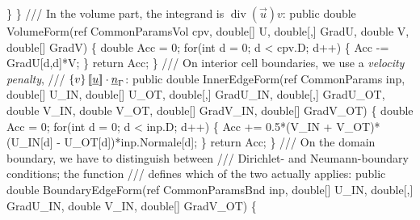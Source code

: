 {\btab \btab \}\newline 
\btab \}\newline 
 \newline 
    /// In the volume part, the integrand is $\operatorname{div}(\vec{u}) v$:
\btab public double VolumeForm(ref CommonParamsVol cpv, \newline 
\btab \btab double[] U, double[,] GradU, \newline 
\btab \btab double V, double[] GradV) \{\newline 
\btab \btab double Acc = 0;\newline 
\btab \btab for(int d = 0; d < cpv.D; d++) \{\newline 
\btab \btab \btab Acc -= GradU[d,d]*V;\newline 
\btab \btab \}\newline 
\btab \btab return Acc;\newline 
\btab \}\newline 
 \newline 
    /// On interior cell boundaries, we use a \emph{velocity penalty},
    /// $\left\{{v}\right\} \left[\!\left[{\underline{u}}\right]\!\right] \cdot \underline{n}_\Gamma$:
\btab public double InnerEdgeForm(ref CommonParams inp, \newline 
\btab \btab double[] U\_IN, double[] U\_OT, double[,] GradU\_IN, double[,] GradU\_OT, \newline 
\btab \btab double V\_IN, double V\_OT, double[] GradV\_IN, double[] GradV\_OT) \{\newline 
 \newline 
\btab \btab double Acc = 0;\newline 
\btab \btab for(int d = 0; d < inp.D; d++) \{\newline 
\btab \btab \btab Acc += 0.5*(V\_IN + V\_OT)*(U\_IN[d] - U\_OT[d])*inp.Normale[d];\newline 
\btab \btab \}\newline 
\btab \btab return Acc;\newline 
\btab \}\newline 
 \newline 
    /// On the domain boundary, we have to distinguish between 
    /// Dirichlet- and Neumann-boundary conditions; the function
    ///  defines which of the two actually applies:
\btab public double BoundaryEdgeForm(ref CommonParamsBnd inp, \newline 
\btab \btab double[] U\_IN, double[,] GradU\_IN, double V\_IN, double[] GradV\_OT) \{\newline 
 \newline 
}
